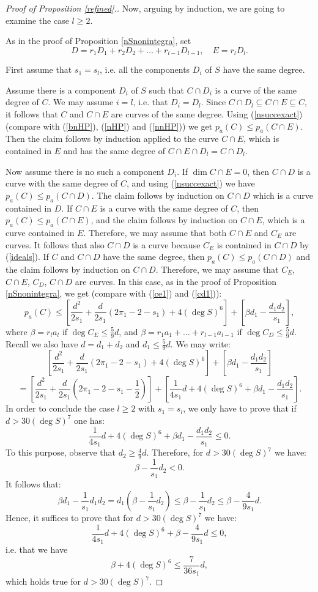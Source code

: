 \documentclass[9pt,a4paper]{amsart}
\theoremstyle{plain}
\theoremstyle{definition}
\theoremstyle{remark}
\begin{document}
\begin{proof}[Proof of Proposition \ref{refined}.]
\smallskip
Now, arguing by induction, we are going to examine  the case $l\geq
2$.

\smallskip
As in the proof of Proposition \ref{nSnonintegra}, set
$$
D=r_1D_1+r_2D_2+\dots+r_{l-1}D_{l-1}, \quad E=r_lD_l.
$$

\smallskip
First assume that $s_1=s_l$, i.e. all the components $D_i$ of $S$
have the same degree.

\smallskip
Assume there is a component $D_i$ of $S$ such that $C\cap D_i$ is a
curve of the same degree of $C$. We may assume $i=l$, i.e. that
$D_i=D_l$. Since $C\cap D_l\subseteq C\cap E\subseteq C$, it follows
that $C$ and $C\cap E$ are curves of the same degree. Using
(\ref{nsuccexact}) (compare with (\ref{bnHP}), (\ref{nHP}) and (\ref{nnHP}))
we get $p_a(C)\leq p_a(C\cap E)$. Then the claim
follows by induction applied to the curve $C\cap E$, which is
contained in $E$ and has the same degree of $C\cap E\cap D_l=C\cap
D_l$.

\smallskip
Now assume there is no such a component $D_i$. If $\dim C\cap E=0$,
then $C\cap D$ is a curve with the same degree of $C$, and using
(\ref{nsuccexact}) we have $p_a(C)\leq p_a(C\cap D)$. The claim
follows by induction on $C\cap D$ which is a curve contained in $D$.
If $C\cap E$ is a curve with the same degree of $C$, then
$p_a(C)\leq p_a(C\cap E)$, and the claim follows by induction on
$C\cap E$, which is a curve contained in $E$. Therefore, we may
assume that both $C\cap E$ and $C_E$ are curves. It follows that
also $C\cap D$ is a curve because $C_E$ is contained in $C\cap D$ by
(\ref{ideals}). If $C$ and $C\cap D$ have the same degree, then
$p_a(C)\leq p_a(C\cap D)$ and the claim follows by induction on
$C\cap D$. Therefore, we may assume that $C_E$, $C\cap E$, $C_D$,
$C\cap D$ are curves. In this case, as in the proof of Proposition
\ref{nSnonintegra}, we get (compare with (\ref{ce1}) and
(\ref{cd1})):
$$
p_a(C)\leq
\left[\frac{d^2}{2s_1}+\frac{d}{2s_1}(2\pi_1-2-s_1)+4(\deg
S)^6\right] +\left[\beta d_1-\frac{d_1d_2}{s_1}\right],
$$
where $\beta=r_la_l$ if $\deg C_E\leq \frac{5}{9}d$, and
$\beta=r_1a_1+\dots+r_{l-1}a_{l-1}$ if $\deg C_D\leq \frac{5}{9}d$.
Recall we also have $d=d_1+d_2$ and $d_1\leq \frac{5}{9}d$. We may
write:
$$
\left[\frac{d^2}{2s_1}+\frac{d}{2s_1}(2\pi_1-2-s_1)+4(\deg
S)^6\right] +\left[\beta d_1-\frac{d_1d_2}{s_1}\right]
$$
$$
=\left[\frac{d^2}{2s_1}+\frac{d}{2s_1}\left(2\pi_1-2-s_1-\frac{1}{2}\right)\right]
+\left[\frac{1}{4s_1}d+4(\deg S)^6+\beta
d_1-\frac{d_1d_2}{s_1}\right].
$$
In order to conclude the case $l\geq 2$ with $s_1=s_l$, we only have
to prove that if $d>30(\deg S)^7$ one has:
$$
\frac{1}{4s_1}d+4(\deg S)^6+\beta d_1-\frac{d_1d_2}{s_1}\leq 0.
$$
To this purpose, observe that $d_2\geq \frac{4}{9}d$. Therefore, for
$d>30(\deg S)^7$ we have:
$$
\beta-\frac{1}{s_1}d_2<0.
$$
It follows that:
$$
\beta
d_1-\frac{1}{s_1}d_1d_2=d_1\left(\beta-\frac{1}{s_1}d_2\right)\leq
\beta-\frac{1}{s_1}d_2\leq \beta-\frac{4}{9s_1}d.
$$
Hence, it suffices to prove that for $d>30(\deg S)^7$ we have:
$$
\frac{1}{4s_1}d+4(\deg S)^6+\beta-\frac{4}{9s_1}d\leq 0,
$$
i.e. that we have
$$
\beta+4(\deg S)^6\leq \frac{7}{36s_1}d,
$$
which holds true for $d>30(\deg S)^7$.


\end{proof}
\end{document}
